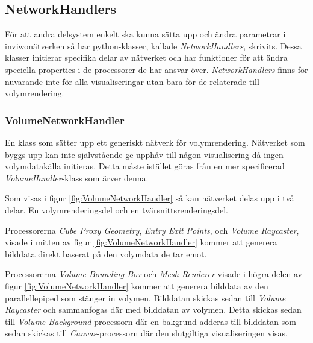 \subsection{NetworkHandlers}\label{ssec:NetworkHandlers}
För att andra delsystem enkelt ska kunna sätta upp och ändra parametrar i inviwonätverken så har python-klasser, kallade \textit{NetworkHandlers}, skrivits. Dessa klasser initierar specifika delar av nätverket och har funktioner för att ändra speciella properties i de processorer de har ansvar över. \textit{NetworkHandlers} finns för nuvarande inte för alla visualiseringar utan bara för de relaterade till volymrendering. 

\subsubsection{VolumeNetworkHandler}
En klass som sätter upp ett generiskt nätverk för volymrendering. Nätverket som byggs upp kan inte självstående ge upphåv till någon visualisering då ingen volymdatakälla initieras. Detta måste istället göras från en mer specificerad \textit{VolumeHandler}-klass som ärver denna.


Som visas i figur \ref{fig:VolumeNetworkHandler} så kan nätverket delas upp i två delar. En volymrenderingsdel och en tvärsnittsrenderingsdel.

Processorerna \textit{Cube Proxy Geometry}, \textit{Entry Exit Points}, och \textit{Volume Raycaster}, visade i mitten av figur \ref{fig:VolumeNetworkHandler} kommer att generera bilddata direkt baserat på den volymdata de tar emot.

Processorerna \textit{Volume Bounding Box} och \textit{Mesh Renderer} visade i högra delen av figur \ref{fig:VolumeNetworkHandler} kommer att generera bilddata av den parallellepiped som stänger in volymen. Bilddatan skickas sedan till \textit{Volume Raycaster} och sammanfogas där med bilddatan av volymen. Detta skickas sedan till \textit{Volume Background}-processorn där en bakgrund adderas till bilddatan som sedan skickas till \textit{Canvas}-processorn där den slutgiltiga visualiseringen visas.

